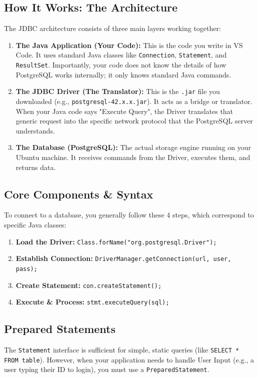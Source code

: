 \documentclass[12pt,a4paper]{article}
\begin{document}
\subsection{How It Works: The Architecture}
The JDBC architecture consists of three main layers working together:

\begin{enumerate}
    \item \textbf{The Java Application (Your Code):}
    This is the code you write in VS Code. It uses standard Java classes like \texttt{Connection}, \texttt{Statement}, and \texttt{ResultSet}. Importantly, your code does not know the details of how PostgreSQL works internally; it only knows standard Java commands.

    \item \textbf{The JDBC Driver (The Translator):}
    This is the \texttt{.jar} file you downloaded (e.g., \texttt{postgresql-42.x.x.jar}). It acts as a bridge or translator. When your Java code says "Execute Query", the Driver translates that generic request into the specific network protocol that the PostgreSQL server understands.

    \item \textbf{The Database (PostgreSQL):}
    The actual storage engine running on your Ubuntu machine. It receives commands from the Driver, executes them, and returns data.
\end{enumerate}

\subsection{Core Components \& Syntax}
To connect to a database, you generally follow these 4 steps, which correspond to specific Java classes:

\begin{enumerate}
    \item \textbf{Load the Driver:} \texttt{Class.forName("org.postgresql.Driver");}
    \item \textbf{Establish Connection:} \texttt{DriverManager.getConnection(url, user, pass);}
    \item \textbf{Create Statement:} \texttt{con.createStatement();}
    \item \textbf{Execute \& Process:} \texttt{stmt.executeQuery(sql);}
\end{enumerate}

\subsection{Prepared Statements}
The \texttt{Statement} interface is sufficient for simple, static queries (like \texttt{SELECT * FROM table}). However, when your application needs to handle User Input (e.g., a user typing their ID to login), you must use a \texttt{PreparedStatement}.
\end{document}
